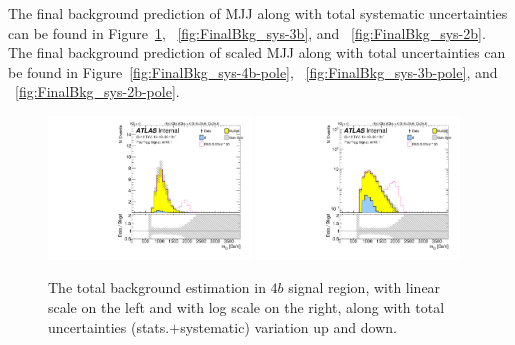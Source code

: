 The final background prediction of MJJ along with total systematic uncertainties can be found in Figure~\ref{fig:FinalBkg_sys-4b}, ~\ref{fig:FinalBkg_sys-3b}, and ~\ref{fig:FinalBkg_sys-2b}. The final background prediction of scaled MJJ along with total uncertainties can be found in Figure~\ref{fig:FinalBkg_sys-4b-pole}, ~\ref{fig:FinalBkg_sys-3b-pole}, and ~\ref{fig:FinalBkg_sys-2b-pole}.


\begin{figure}
\begin{center}
\includegraphics[width=0.48\textwidth,angle=-90]{figures/boosted/Signal_Syst/Moriond_bkg_9_FourTag_Signal_mHH_l_blind.pdf}
\includegraphics[width=0.48\textwidth,angle=-90]{figures/boosted/Signal_Syst/Moriond_bkg_9_FourTag_Signal_mHH_l_1_blind.pdf}
\caption{The total background estimation in $4b$ signal region, with linear scale on the left and with log scale on the right, along with total uncertainties (stats.$+$systematic) variation up and down.}
\label{fig:FinalBkg_sys-4b}
\end{center}
\end{figure}


